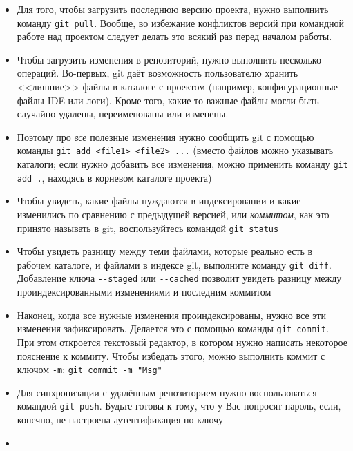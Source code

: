 \documentclass[handout]{beamer}
\begin{document}
\begin{frame}
	\begin{itemize}
		\item{Для того, чтобы загрузить последнюю версию проекта, нужно выполнить команду \texttt{git pull}. Вообще, во избежание конфликтов версий при командной работе над проектом следует делать это всякий раз перед началом работы.}\pause
		\item{Чтобы загрузить изменения в репозиторий, нужно выполнить несколько операций. Во-первых, git даёт возможность пользователю хранить <<лишние>> файлы в каталоге с проектом (например, конфигурационные файлы IDE или логи). Кроме того, какие-то важные файлы могли быть случайно удалены, переименованы или изменены.}\pause
		\item{Поэтому про \emph{все} полезные изменения нужно сообщить git с помощью команды \texttt{git add <file1> <file2> ...} (вместо файлов можно указывать каталоги; если нужно добавить все изменения, можно применить команду \texttt{git add .}, находясь в корневом каталоге проекта)}
	\end{itemize}
\end{frame}

\begin{frame}
	\begin{itemize}
		\item{Чтобы увидеть, какие файлы нуждаются в индексировании и какие изменились по сравнению с предыдущей версией, или \emph{коммитом}, как это принято называть в git, воспользуйтесь командой \texttt{git status}}\pause
		\item{Чтобы увидеть разницу между теми файлами, которые реально есть в рабочем каталоге, и файлами в индексе git, выполните команду \texttt{git diff}. Добавление ключа \texttt{-{}-staged} или \texttt{-{}-cached} позволит увидеть разницу между проиндексированными изменениями и последним коммитом}\pause
		\item{Наконец, когда все нужные изменения проиндексированы, нужно все эти изменения зафиксировать. Делается это с помощью команды \texttt{git commit}. При этом откроется текстовый редактор, в котором нужно написать некоторое пояснение к коммиту. Чтобы избедать этого, можно выполнить коммит с ключом \texttt{-m}: \texttt{git commit -m "Msg"}}
	\end{itemize}
\end{frame}

\begin{frame}
	\begin{itemize}
		\item{Для синхронизации с удалённым репозиторием нужно воспользоваться командой \texttt{git push}. Будьте готовы к тому, что у Вас попросят пароль, если, конечно, не настроена аутентификация по ключу}\pause
		\item{}
	\end{itemize}
\end{frame}
\end{document}
